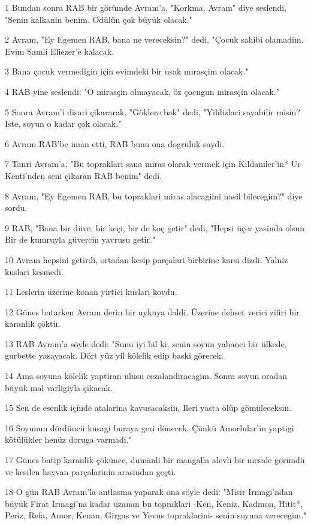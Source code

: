 \par 1 Bundan sonra RAB bir görümde Avram'a, "Korkma, Avram" diye seslendi, "Senin kalkanin benim. Ödülün çok büyük olacak."
\par 2 Avram, "Ey Egemen RAB, bana ne vereceksin?" dedi, "Çocuk sahibi olamadim. Evim Samli Eliezer'e kalacak.
\par 3 Bana çocuk vermedigin için evimdeki bir usak mirasçim olacak."
\par 4 RAB yine seslendi: "O mirasçin olmayacak, öz çocugun mirasçin olacak."
\par 5 Sonra Avram'i disari çikararak, "Göklere bak" dedi, "Yildizlari sayabilir misin? Iste, soyun o kadar çok olacak."
\par 6 Avram RAB'be iman etti, RAB bunu ona dogruluk saydi.
\par 7 Tanri Avram'a, "Bu topraklari sana miras olarak vermek için Kildaniler'in* Ur Kenti'nden seni çikaran RAB benim" dedi.
\par 8 Avram, "Ey Egemen RAB, bu topraklari miras alacagimi nasil bilecegim?" diye sordu.
\par 9 RAB, "Bana bir düve, bir keçi, bir de koç getir" dedi, "Hepsi üçer yasinda olsun. Bir de kumruyla güvercin yavrusu getir."
\par 10 Avram hepsini getirdi, ortadan kesip parçalari birbirine karsi dizdi. Yalniz kuslari kesmedi.
\par 11 Leslerin üzerine konan yirtici kuslari kovdu.
\par 12 Günes batarken Avram derin bir uykuya daldi. Üzerine dehset verici zifiri bir karanlik çöktü.
\par 13 RAB Avram'a söyle dedi: "Sunu iyi bil ki, senin soyun yabanci bir ülkede, gurbette yasayacak. Dört yüz yil kölelik edip baski görecek.
\par 14 Ama soyuna kölelik yaptiran ulusu cezalandiracagim. Sonra soyun oradan büyük mal varligiyla çikacak.
\par 15 Sen de esenlik içinde atalarina kavusacaksin. Ileri yasta ölüp gömüleceksin.
\par 16 Soyunun dördüncü kusagi buraya geri dönecek. Çünkü Amorlular'in yaptigi kötülükler henüz doruga varmadi."
\par 17 Günes batip karanlik çökünce, dumanli bir mangalla alevli bir mesale göründü ve kesilen hayvan parçalarinin arasindan geçti.
\par 18 O gün RAB Avram'la antlasma yaparak ona söyle dedi: "Misir Irmagi'ndan büyük Firat Irmagi'na kadar uzanan bu topraklari -Ken, Keniz, Kadmon, Hitit*, Periz, Refa, Amor, Kenan, Girgas ve Yevus topraklarini- senin soyuna verecegim."

